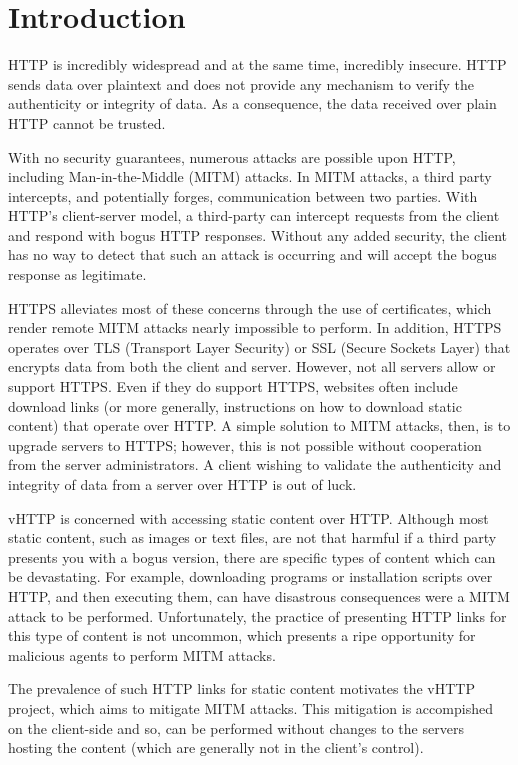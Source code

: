 \section{Introduction}
\label{sec:intro}

HTTP is incredibly widespread and at the same time, incredibly insecure. HTTP
sends data over plaintext and does not provide any mechanism to verify the
authenticity or integrity of data. As a consequence, the data received over
plain HTTP cannot be trusted.

With no security guarantees, numerous attacks are possible upon HTTP, including
Man-in-the-Middle (MITM) attacks. In MITM attacks, a third party intercepts,
and potentially forges, communication between two parties. With HTTP's
client-server model, a third-party can intercept requests from the client and
respond with bogus HTTP responses. Without any added security, the client has
no way to detect that such an attack is occurring and will accept the bogus
response as legitimate.

HTTPS alleviates most of these concerns through the use of certificates, which
render remote MITM attacks nearly impossible to perform. In addition, HTTPS
operates over TLS (Transport Layer Security) or SSL (Secure Sockets Layer) that
encrypts data from both the client and server. However, not all servers allow
or support HTTPS. Even if they do support HTTPS, websites often include
download links (or more generally, instructions on how to download static
content) that operate over HTTP. A simple solution to MITM attacks, then, is
to upgrade servers to HTTPS; however, this is not possible without cooperation
from the server administrators. A client wishing to validate the authenticity
and integrity of data from a server over HTTP is out of luck.

vHTTP is concerned with accessing static content over HTTP. Although most
static content, such as images or text files, are not that harmful if a third
party presents you with a bogus version, there are specific types of content
which can be devastating. For example, downloading programs or installation
scripts over HTTP, and then executing them, can have disastrous consequences
were a MITM attack to be performed. Unfortunately, the practice of presenting
HTTP links for this type of content is not uncommon, which presents a ripe
opportunity for malicious agents to perform MITM attacks.

The prevalence of such HTTP links for static content motivates the vHTTP
project, which aims to mitigate MITM attacks. This mitigation is accompished on
the client-side and so, can be performed without changes to the servers hosting
the content (which are generally not in the client's control).

\cite{empty-citation}
